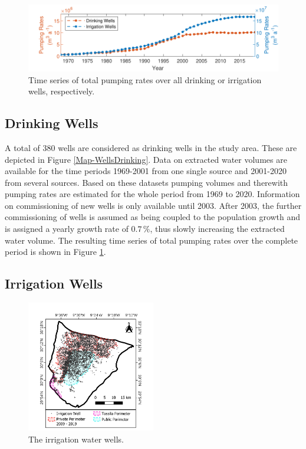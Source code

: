 \begin{figure}[t!]
    \centering
    \includegraphics{./img/Fig-WellsTotalRates.pdf}
    \captionsetup{format=hang,labelfont=bf,textfont=it}
    \captionsetup{format=hang, textfont=it, labelfont=bf}
    \caption{Time series of total pumping rates over all drinking or irrigation wells, respectively.}
    \label{Fig-WellsPumpTS}
\end{figure}

\subsection{Drinking Wells}

A total of 380 wells are considered as drinking wells in the study area. 
These are depicted in Figure \ref{Map-WellsDrinking}. 
Data on extracted water volumes are available for the time periods 1969-2001 from one single source and 2001-2020 from several sources. 
Based on these datasets pumping volumes and therewith pumping rates are estimated for the whole period from 1969 to 2020. 
Information on commissioning of new wells is only available until 2003. 
After 2003, the further commissioning of wells is assumed as being coupled to the population growth and is assigned a yearly growth rate of $0.7 \, \%$, thus slowly increasing the extracted water volume.
The resulting time series of total pumping rates over the complete period is shown in Figure \ref{Fig-WellsPumpTS}.

\subsection{Irrigation Wells}

\begin{figure}
    \vspace{-64pt}
    \centering
    \includegraphics[width=0.5\textwidth]{./img/Map_WellsIrrigation.pdf}
    \vspace{-18pt}
    \captionsetup{format=plain, textfont=it, labelfont=bf}
    \caption{The irrigation water wells.}
    \vspace{-24pt}
    \label{Map-WellsIrrigation}
\end{figure}

